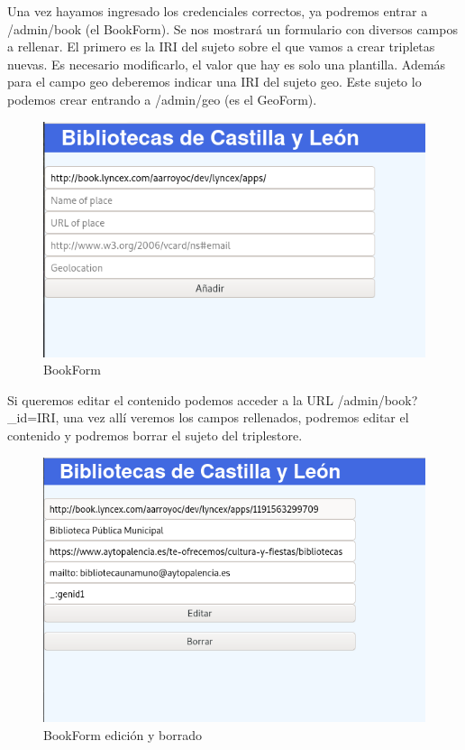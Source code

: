 \documentclass[12pt]{report} %
\begin{document}
Una vez hayamos ingresado los credenciales correctos, ya podremos entrar a /admin/book (el BookForm). Se nos mostrará un formulario con diversos campos a rellenar. El primero es la IRI del sujeto sobre el que vamos a crear tripletas nuevas. Es necesario modificarlo, el valor que hay es solo una plantilla. Además para el campo geo deberemos indicar una IRI del sujeto geo. Este sujeto lo podemos crear entrando a /admin/geo (es el GeoForm).

\begin{figure}
    \centering
    \includegraphics{tour/bibliocyl5.png}
    \caption{BookForm}
    \label{fig:bibliocyl5}
\end{figure}

Si queremos editar el contenido podemos acceder a la URL /admin/book?\_id=IRI, una vez allí veremos los campos rellenados, podremos editar el contenido y podremos borrar el sujeto del triplestore.

\begin{figure}
    \centering
    \includegraphics[width=\textwidth]{tour/bibliocyl7.png}
    \caption{BookForm edición y borrado}
    \label{fig:bibliocyl7}
\end{figure}
\end{document}
